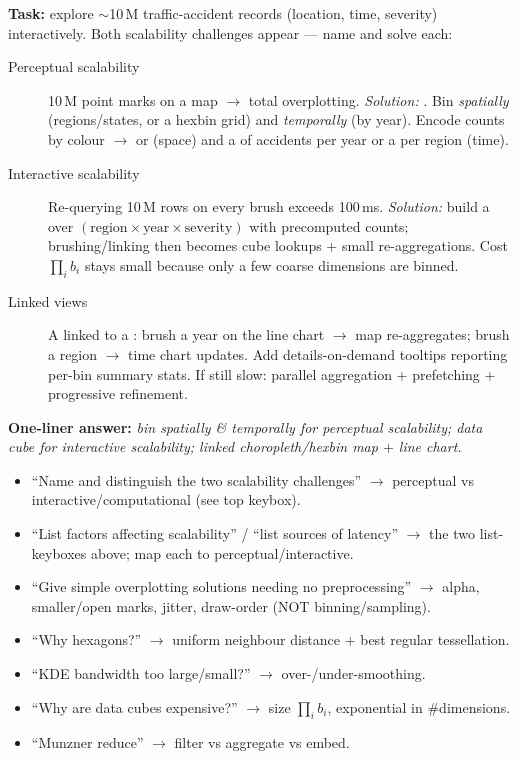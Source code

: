 \begin{exambox}
\textbf{Task:} explore $\sim$10\,M traffic-accident records (location, time,
severity) interactively. Both scalability challenges appear --- name and solve
each:
\begin{description}
  \item[Perceptual scalability] 10\,M point marks on a map $\to$ total
        overplotting. \emph{Solution:} . Bin
        \emph{spatially} (regions/states, or a hexbin grid) and
        \emph{temporally} (by year). Encode counts by colour $\to$
         or  (space) and a
         of accidents per year or a  per
        region (time).
  \item[Interactive scalability] Re-querying 10\,M rows on every brush exceeds
        100\,ms. \emph{Solution:} build a  over
        $(\text{region}\times\text{year}\times\text{severity})$ with
        precomputed counts; brushing/linking then becomes cube lookups +
        small re-aggregations. Cost $\prod_i b_i$ stays small because only a
        few coarse dimensions are binned.
  \item[Linked views] A  linked to a
        : brush a year on the line chart $\to$ map
        re-aggregates; brush a region $\to$ time chart updates. Add
        details-on-demand tooltips reporting per-bin summary stats. If still
        slow: parallel aggregation + prefetching + progressive refinement.
\end{description}
\textbf{One-liner answer:} \emph{bin spatially \& temporally for perceptual
scalability; data cube for interactive scalability; linked
choropleth/hexbin map $+$ line chart.}
\end{exambox}

\begin{exambox}
\begin{itemize}
  \item ``Name and distinguish the two scalability challenges'' $\to$
        perceptual vs interactive/computational (see top keybox).
  \item ``List factors affecting scalability'' / ``list sources of latency''
        $\to$ the two list-keyboxes above; map each to perceptual/interactive.
  \item ``Give simple overplotting solutions needing no preprocessing'' $\to$
        alpha, smaller/open marks, jitter, draw-order (NOT binning/sampling).
  \item ``Why hexagons?'' $\to$ uniform neighbour distance + best regular
        tessellation.
  \item ``KDE bandwidth too large/small?'' $\to$ over-/under-smoothing.
  \item ``Why are data cubes expensive?'' $\to$ size $\prod_i b_i$, exponential
        in \#dimensions.
  \item ``Munzner reduce'' $\to$ filter vs aggregate vs embed.
\end{itemize}
\end{exambox}
